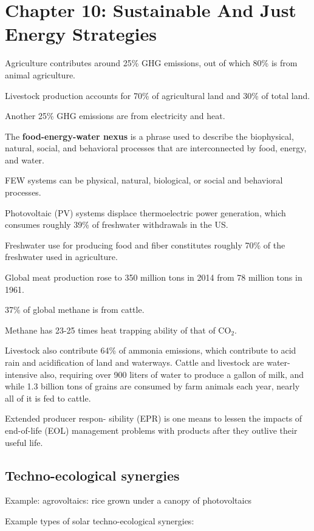 \section{Chapter 10: Sustainable And Just Energy Strategies}

Agriculture contributes around 25\% GHG emissions, out of which 80\% is from
animal agriculture.

Livestock production accounts for 70\% of agricultural land and 30\% of total
land.

Another 25\% GHG emissions are from electricity and heat.

The \textbf{food-energy-water nexus} is a phrase used to describe the
biophysical, natural, social, and behavioral processes that are interconnected
by food, energy, and water.

FEW systems can be physical, natural, biological, or social and behavioral
processes.

Photovoltaic (PV) systems displace
thermoelectric power generation, which consumes roughly 39\% of freshwater
withdrawals in the US.

Freshwater use for producing
food and fiber constitutes roughly 70\% of the freshwater used in agriculture.

Global meat production rose to 350 million tons in 2014 from
78 million tons in 1961.

37\% of global methane is from cattle.

Methane has 23-25 times heat trapping ability of that of CO$_2$.

Livestock also contribute 64\% of ammonia emissions, which contribute to acid
rain and acidification of land and waterways. Cattle and livestock are
water-intensive also, requiring over 900 liters of water to produce a gallon
of milk, and while 1.3 billion tons of grains are consumed by farm animals
each year, nearly all of it is fed to cattle.

Extended producer respon-
sibility (EPR) is one means to lessen the impacts of end-of-life (EOL)
management problems with products after they outlive their useful life.

\subsection{Techno-ecological synergies}

Example: agrovoltaics: rice grown under a canopy of photovoltaics

Example types of solar techno-ecological synergies:

